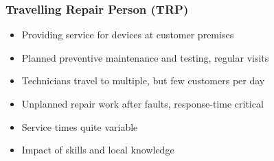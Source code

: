 
\begin{frame}
\frametitle{Travelling Repair Person (TRP)}
\begin{itemize}
\item Providing service for devices at customer premises
\item Planned preventive maintenance and testing, regular visits
\item Technicians travel to multiple, but few customers per day
\item Unplanned repair work after faults, response-time critical
\item Service times quite variable
\item Impact of skills and local knowledge
\end{itemize}
\end{frame}

